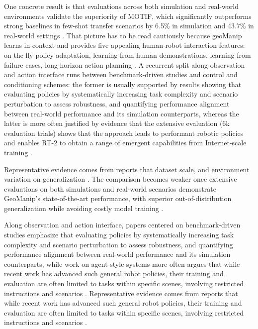 \documentclass[a4paper,11pt]{article}
\begin{document}
One concrete result is that evaluations across both simulation and real-world environments validate the superiority of MOTIF, which significantly outperforms strong baselines in few-shot transfer scenarios by 6.5\% in simulation and 43.7\% in real-world settings \citep{Zhi2026Motif}. That picture has to be read cautiously because geoManip learns in-context and provides five appealing human-robot interaction features: on-the-fly policy adaptation, learning from human demonstrations, learning from failure cases, long-horizon action planning \citep{Tang2025Geomanip}. A recurrent split along observation and action interface runs between benchmark-driven studies and control and conditioning schemes: the former is usually supported by results showing that evaluating policies by systematically increasing task complexity and scenario perturbation to assess robustness, and quantifying performance alignment between real-world performance and its simulation counterparts, whereas the latter is more often justified by evidence that the extensive evaluation (6k evaluation trials) shows that the approach leads to performant robotic policies and enables RT-2 to obtain a range of emergent capabilities from Internet-scale training \citep{Yang2025Robot,Tang2025Geomanip,Brohan2023Vision,Dong2026Capturing}.

Representative evidence comes from reports that dataset scale, and environment variation on generalization \citep{Nasiriany2026Robocasa365}. The comparison becomes weaker once extensive evaluations on both simulations and real-world scenarios demonstrate GeoManip's state-of-the-art performance, with superior out-of-distribution generalization while avoiding costly model training \citep{Tang2025Geomanip}.

Along observation and action interface, papers centered on benchmark-driven studies emphasize that evaluating policies by systematically increasing task complexity and scenario perturbation to assess robustness, and quantifying performance alignment between real-world performance and its simulation counterparts, while work on agent-style systems more often argues that while recent work has advanced such general robot policies, their training and evaluation are often limited to tasks within specific scenes, involving restricted instructions and scenarios \citep{Yang2025Robot,Tang2025Geomanip,Dai2025Manitaskgen}. Representative evidence comes from reports that while recent work has advanced such general robot policies, their training and evaluation are often limited to tasks within specific scenes, involving restricted instructions and scenarios \citep{Dai2025Manitaskgen}.
\end{document}
